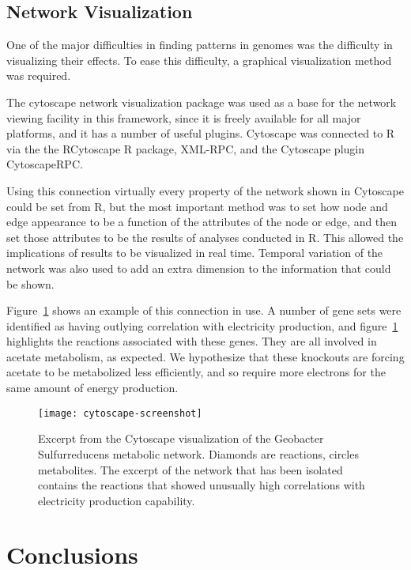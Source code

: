 \documentclass[a4paper,twocolumn]{article}
\begin{document}
\subsection{Network Visualization}
One of the major difficulties in finding patterns in genomes was the difficulty in visualizing their effects. To ease this difficulty, a graphical visualization method was required.

The cytoscape network visualization package was used as a base for the network viewing facility in this framework, since it is freely available for all major platforms, and it has a number of useful plugins. Cytoscape was connected to R via the the RCytoscape R package, XML-RPC, and the Cytoscape plugin CytoscapeRPC.

Using this connection virtually every property of the network shown in Cytoscape could be set from R, but the most important method was to set how node and edge appearance to be a function of the attributes of the node or edge, and then set those attributes to be the results of analyses conducted in R. This allowed the implications of results to be visualized in real time. Temporal variation of the network was also used to add an extra dimension to the information that could be shown.

Figure~\ref{fig:cytoscape-screenshot} shows an example of this connection in use. A number of gene sets were identified as having outlying correlation with electricity production, and figure~\ref{fig:cytoscape-screenshot} highlights the reactions associated with these genes. They are all involved in acetate metabolism, as expected. We hypothesize that these knockouts are forcing acetate to be metabolized less efficiently, and so require more electrons for the same amount of energy production.

\begin{figure}[h]
\label{fig:cytoscape-screenshot}
\texttt{[image: cytoscape-screenshot]}
\caption{Excerpt from the Cytoscape visualization of the Geobacter Sulfurreducens metabolic network. Diamonds are reactions, circles metabolites. The excerpt of the network that has been isolated contains the reactions that showed unusually high correlations with electricity production capability.}
\end{figure}

\section{Conclusions}
\end{document}
